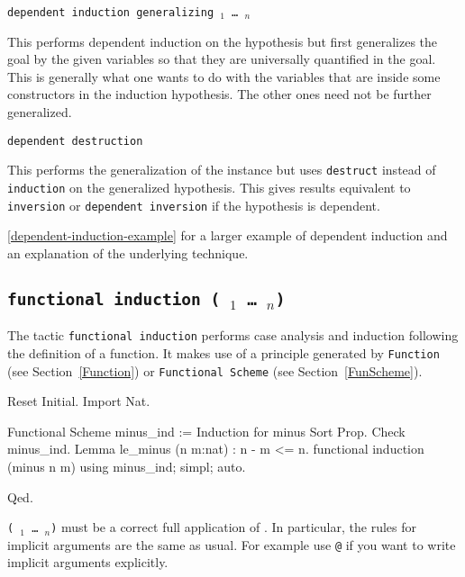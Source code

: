 \begin{coq_example*}
\begin{Variants}
\item {\tt dependent induction {\ident} generalizing {\ident$_1$} \dots
    {\ident$_n$}}

  This performs dependent induction on the hypothesis {\ident} but first
  generalizes the goal by the given variables so that they are
  universally quantified in the goal. This is generally what one wants
  to do with the variables that are inside some constructors in the
  induction hypothesis. The other ones need not be further generalized.

\item {\tt dependent destruction {\ident}}

  This performs the generalization of the instance {\ident} but uses {\tt destruct}
  instead of {\tt induction} on the generalized hypothesis. This gives
  results equivalent to {\tt inversion} or {\tt dependent inversion} if
  the hypothesis is dependent.
\end{Variants}

\SeeAlso \ref{dependent-induction-example} for a larger example of
dependent induction and an explanation of the underlying technique.

\subsection{\tt functional induction (\qualid\ \term$_1$ \dots\ \term$_n$)}
\label{FunInduction}

The tactic \texttt{functional induction} performs
case analysis and induction following the definition of a function. It
makes use of a principle generated by \texttt{Function}
(see Section~\ref{Function}) or \texttt{Functional Scheme}
(see Section~\ref{FunScheme}).

\begin{coq_eval}
Reset Initial.
Import Nat.
\end{coq_eval}
\begin{coq_example}
Functional Scheme minus_ind := Induction for minus Sort Prop.
Check minus_ind.
Lemma le_minus (n m:nat) : n - m <= n.
functional induction (minus n m) using minus_ind; simpl; auto.
\end{coq_example}
\begin{coq_example*}
Qed.
\end{coq_example*}

\Rem \texttt{(\qualid\ \term$_1$ \dots\ \term$_n$)} must be a correct
full application of \qualid. In particular, the rules for implicit
arguments are the same as usual. For example use \texttt{@\qualid} if
you want to write implicit arguments explicitly.


\end{coq_example*}
